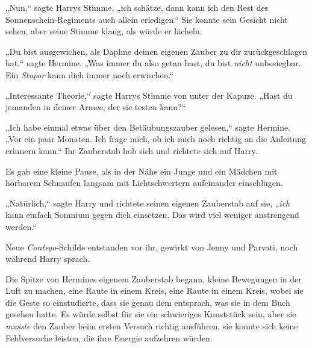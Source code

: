 „Nun,“ sagte Harrys Stimme, „ich schätze, dann kann ich den Rest des Sonnenschein-Regiments auch allein erledigen.“ Sie konnte sein Gesicht nicht sehen, aber seine Stimme klang, als würde er lächeln.

„Du bist ausgewichen, als Daphne deinen eigenen Zauber zu dir zurückgeschlagen hat,“ sagte Hermine. „Was immer du also getan hast, du bist \emph{nicht} unbesiegbar. Ein \emph{Stupor} kann dich immer noch erwischen.“

„Interessante Theorie,“ sagte Harrys Stimme von unter der Kapuze. „Hast du jemanden in deiner Armee, der sie testen kann?“

„Ich habe einmal etwas über den Betäubungszauber gelesen,“ sagte Hermine. „Vor ein paar Monaten. Ich frage mich, ob ich mich noch richtig an die Anleitung erinnern kann.“ Ihr Zauberstab hob sich und richtete sich auf Harry.

Es gab eine kleine Pause, als in der Nähe ein Junge und ein Mädchen mit hörbarem Schnaufen langsam mit Lichtschwertern aufeinander einschlugen.

„Natürlich,“ sagte Harry und richtete seinen eigenen Zauberstab auf sie, „\emph{ich} kann einfach Somnium gegen dich einsetzen. Das wird viel weniger anstrengend werden.“

Neue \emph{Contego}-Schilde entstanden vor ihr, gewirkt von Jenny und Parvati, noch während Harry sprach.

Die Spitze von Hermines eigenem Zauberstab begann, kleine Bewegungen in der Luft zu machen, eine Raute in einem Kreis, eine Raute in einem Kreis, wobei sie die Geste so einstudierte, dass sie genau dem entsprach, was sie in dem Buch gesehen hatte. Es würde selbst für sie ein schwieriges Kunststück sein, aber sie \emph{musste} den Zauber beim ersten Versuch richtig ausführen, sie konnte sich keine Fehlversuche leisten, die ihre Energie aufzehren würden.

